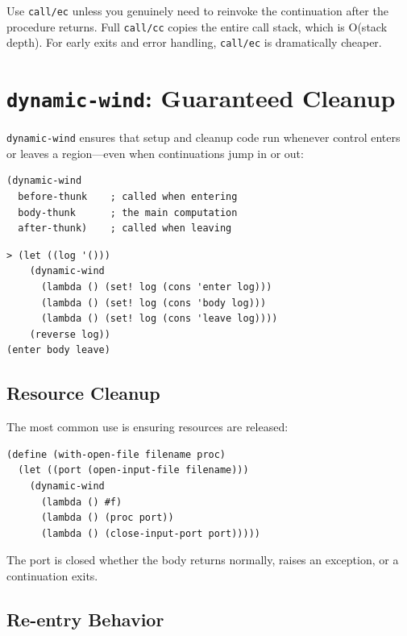 \begin{warning}
Use \texttt{call/ec} unless you genuinely need to reinvoke the continuation after the procedure returns. Full \texttt{call/cc} copies the entire call stack, which is O(stack depth). For early exits and error handling, \texttt{call/ec} is dramatically cheaper.
\end{warning}

\section{\texttt{dynamic-wind}: Guaranteed Cleanup}

\texttt{dynamic-wind} ensures that setup and cleanup code run whenever control enters or leaves a region---even when continuations jump in or out:

\begin{lstlisting}
(dynamic-wind
  before-thunk    ; called when entering
  body-thunk      ; the main computation
  after-thunk)    ; called when leaving
\end{lstlisting}

\begin{lstlisting}[style=repl]
> (let ((log '()))
    (dynamic-wind
      (lambda () (set! log (cons 'enter log)))
      (lambda () (set! log (cons 'body log)))
      (lambda () (set! log (cons 'leave log))))
    (reverse log))
(enter body leave)
\end{lstlisting}

\subsection{Resource Cleanup}

The most common use is ensuring resources are released:

\begin{lstlisting}
(define (with-open-file filename proc)
  (let ((port (open-input-file filename)))
    (dynamic-wind
      (lambda () #f)
      (lambda () (proc port))
      (lambda () (close-input-port port)))))
\end{lstlisting}

The port is closed whether the body returns normally, raises an exception, or a continuation exits.

\subsection{Re-entry Behavior}

